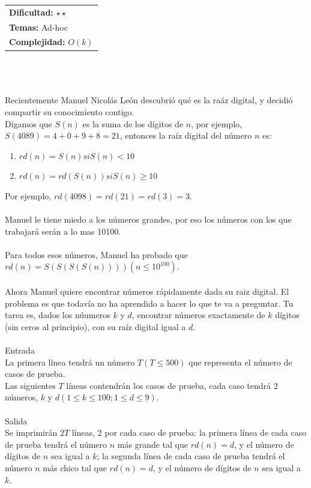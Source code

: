 \documentclass[12pt]{article}
\begin{document}
\hfill
\begin{tabular}{@{}l@{}}
\textbf{Dificultad:} $\star \star$ \\
\textbf{Temas:} Ad-hoc \\
\textbf{Complejidad:} $O(k)$
\end{tabular}\\
\\
\\
Recientemente Manuel Nicolás León descubrió qué es la raáz digital, y decidió compartir su conocimiento contigo.\\
Digamos que $S(n)$ es la suma de los dígitos de $n$, por ejemplo, $S(4089) = 4 + 0 + 9 + 8 = 21$, entonces la raíz
digital del número $n$ es:
\begin{enumerate}
\item $rd(n) = S(n)  		si S(n) < 10$
\item $rd(n) = rd(S(n)) 	si S(n) ≥ 10$
\end{enumerate}
Por ejemplo, $rd(4098) = rd(21) = rd(3) = 3$.
\\ \\Manuel le tiene miedo a los números grandes, por eso los números con los que trabajará serán a lo mas 10100.\\
\\Para todos esos números, Manuel ha probado que \\$rd(n) = S(S(S(S(n))))(n ≤ 10^100)$.\\
\\Ahora Manuel quiere encontrar números rápidamente dada su raiz digital. El problema es que todavía no ha aprendido a hacer lo que te va a preguntar. Tu tarea es, dados los núumeros $k$ y $d$, encontrar números exactamente de $k$ dígitos (sin ceros al principio), con su raíz digital igual a $d$.
\\
\\
\textrm{\large Entrada}
\\
La primera línea tendrá un número $T (T ≤ 500)$ que representa el número de casos de prueba.\\
Las siguientes $T$ líneas contendrán los casos de prueba, cada caso tendrá 2 números, $k$ y $d (1 ≤ k ≤ 100; 1 ≤ d ≤ 9)$.
\\
\\
\textrm{\large Salida}
\\
Se imprimirán $2T$ líneas, $2$ por cada caso de prueba: la primera línea de cada caso de prueba tendrá el número $n$ más grande tal que $rd(n) = d$, y el número de dígitos de $n$ sea igual a $k$; la segunda línea de cada caso de prueba tendrá el número $n$ más chico tal que $rd(n) = d$, y el número de dígitos de $n$ sea igual a $k$.\\
\end{document}
